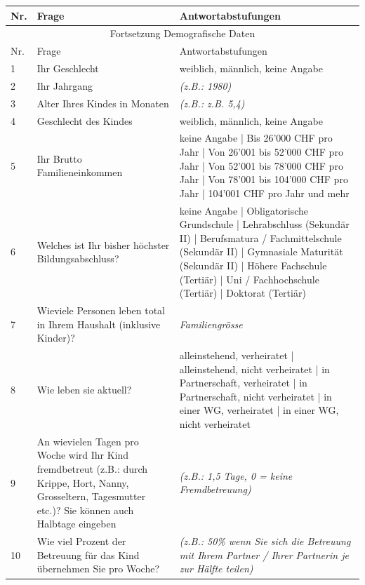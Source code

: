 \begin{flushleft}
\begin{longtable}[c]{ |p{1em}|p{16em}|p{16em}| }
 
  \hline
  Nr. & Frage & Antwortabstufungen \\
  \hline
  \endfirsthead
 
  \hline
  \multicolumn{3}{|c|}{ Fortsetzung Demografische Daten}\\
  \hline
  Nr. & Frage & Antwortabstufungen \\
  \hline
  \endhead
 
  \hline
  \endfoot
 
  \hline\hline
  \endlastfoot
 
  1 & Ihr Geschlecht & weiblich, männlich,  keine Angabe \\
  2 & Ihr Jahrgang & \textit{(z.B.: 1980)}  \\
  3 & Alter Ihres Kindes in Monaten & \textit{(z.B.: z.B. 5,4)}\\
  4 & Geschlecht des Kindes & weiblich, männlich, keine Angabe \\
  5 & Ihr Brutto Familieneinkommen & keine Angabe | Bis 26’000 CHF pro Jahr | Von 26’001 bis 52’000 CHF pro Jahr | Von 52’001 bis 78’000 CHF pro Jahr | Von 78’001 bis 104’000 CHF pro Jahr | 104’001 CHF pro Jahr und mehr \\
  6 & Welches ist Ihr bisher höchster Bildungsabschluss? & keine Angabe | Obligatorische Grundschule | Lehrabschluss (Sekundär II) | Berufsmatura / Fachmittelschule (Sekundär II) | Gymnasiale Maturität (Sekundär II) | Höhere Fachschule (Tertiär) | Uni / Fachhochschule (Tertiär) | Doktorat (Tertiär) \\
  7 & Wieviele Personen leben total in Ihrem Haushalt (inklusive Kinder)? & \textit{Familiengrösse} \\
  8 & Wie leben sie aktuell? & alleinstehend, verheiratet | alleinstehend, nicht verheiratet | in Partnerschaft, verheiratet | in Partnerschaft, nicht verheiratet | in einer WG, verheiratet | in einer WG, nicht verheiratet \\
  9 & An wievielen Tagen pro Woche wird Ihr Kind fremdbetreut (z.B.: durch Krippe, Hort, Nanny, Grosseltern, Tagesmutter etc.)? Sie können auch Halbtage eingeben & \textit{(z.B.: 1,5 Tage, 0 = keine Fremdbetreuung)} \\
  10 & Wie viel Prozent der Betreuung für das Kind übernehmen Sie pro Woche? & \textit{(z.B.: 50\% wenn Sie sich die Betreuung mit Ihrem Partner / Ihrer Partnerin je zur Hälfte teilen)} \\
  

\end{longtable}
\end{flushleft}
